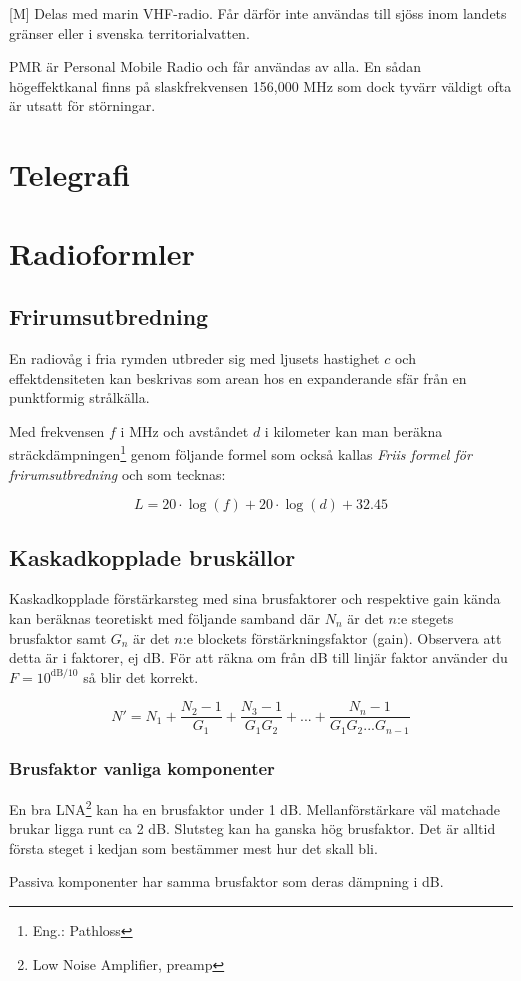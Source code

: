 \documentclass[12pt,swedish,a4paper]{article}
\begin{document}
[M] Delas med marin VHF-radio. Får därför inte användas till sjöss inom landets gränser eller i svenska territorialvatten.

PMR är Personal Mobile Radio och får användas av alla. En sådan högeffektkanal finns på slaskfrekvensen 156,000 MHz som dock tyvärr väldigt ofta är utsatt för störningar.

\section{Telegrafi}

\section{Radioformler}

\subsection{Frirumsutbredning}

En radiovåg i fria rymden utbreder sig med ljusets hastighet $c$ och effektdensiteten kan beskrivas som arean hos en expanderande sfär från en punktformig strålkälla.

Med frekvensen $f$ i MHz och avståndet $d$ i kilometer kan man beräkna sträck\-dämp\-ning\-en\footnote{Eng.: Pathloss} genom följande formel som också kallas \emph{Friis formel för frirumsutbredning} och som tecknas:

\begin{equation}
L=20\cdot \log(f) + 20\cdot \log(d) +32.45
\end{equation}

\subsection{Kaskadkopplade bruskällor}

Kaskadkopplade förstärkarsteg med sina brusfaktorer och respektive gain kända kan beräknas teoretiskt med följande samband där $N_n$ är det $n$:e stegets brusfaktor samt $G_n$ är det $n$:e blockets förstärkningsfaktor (gain). Observera att detta är i faktorer, ej dB. För att räkna om från dB till linjär faktor använder du $F=10^{\mathrm{dB}/10}$ så blir det korrekt.

\begin{equation}
N'=N_1+\frac{N_2-1}{G_1} + \frac{N_3-1}{G_1G_2} + ... + \frac{N_n-1}{G_1G_2...G_{n-1}}
\end{equation}

\subsubsection{Brusfaktor vanliga komponenter}

En bra LNA\footnote{Low Noise Amplifier, preamp} kan ha en brusfaktor under 1 dB. Mellanförstärkare väl matchade brukar ligga runt ca 2 dB. Slutsteg kan ha ganska hög brusfaktor. Det är alltid första steget i kedjan som bestämmer mest hur det skall bli.

Passiva komponenter har samma brusfaktor som deras dämpning i dB.
\end{document}
